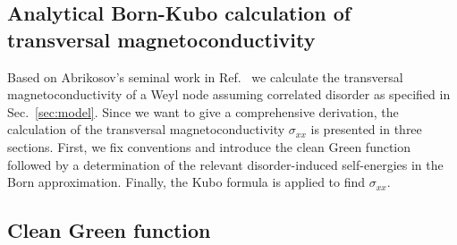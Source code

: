 \documentclass[aps,prb,10pt,amsmath,amssymb,twocolumn,floatfix,superscriptaddress,showpacs,numerical,footinbib]{revtex4-1}
\begin{document}
\appendix
\begin{widetext}
\section{Analytical Born-Kubo calculation of transversal magnetoconductivity}

Based on Abrikosov's seminal work in Ref.~ we calculate the transversal magnetoconductivity of a Weyl node assuming correlated disorder as specified in Sec.~\ref{sec:model}.
%
Since we want to give a comprehensive derivation, the calculation of the transversal magnetoconductivity $\sigma_{xx}$ is presented in three sections.
%
First, we fix conventions and introduce the clean Green function followed by a determination of the relevant disorder-induced self-energies in the Born approximation.
%
Finally, the Kubo formula is applied to find $\sigma_{xx}$.

\subsection{Clean Green function}


\end{widetext}
\end{document}
